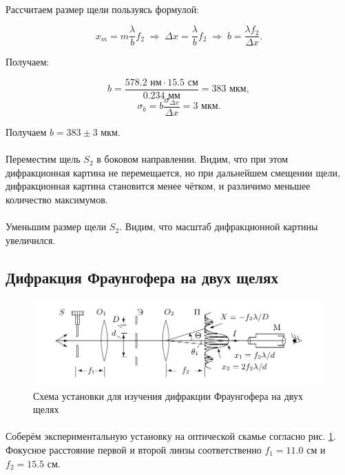 \documentclass[a4paper,12pt]{article} %
\begin{document}
\paragraph{} Рассчитаем размер щели пользуясь формулой:

\[
x_m = m \frac{\lambda}{b} f_2 \; \Rightarrow \; \Delta x = \frac{\lambda}{b} f_2 \; \Rightarrow \; b = \frac{\lambda f_2}{\Delta x}.
\]

\noindent Получаем:

\[
b = \frac{578.2 \text{ нм} \cdot 15.5 \text{ см}}{0.234 \text{ мм}} = 383 \text{ мкм},
\]\[
\sigma_b = b \frac{\sigma_{\Delta x}}{\Delta x} = 3 \text{ мкм}.
\]

\noindent Получаем $b = 383 \pm 3$ мкм.

\paragraph{} Переместим щель $S_2$ в боковом направлении. Видим, что при этом дифракционная картина не перемещается, но при дальнейшем смещении щели, дифракционная картина становится менее чётком, и различимо меньшее количество максимумов.

\paragraph{} Уменьшим размер щели $S_2$. Видим, что масштаб дифракционной картины увеличился.


\subsection{Дифракция Фраунгофера на двух щелях}

\begin{figure}[h]
\centering
\includegraphics[width=\textwidth]{setup3.png}
\caption{Схема установки для изучения дифракции Фраунгофера на двух щелях}
\label{fig:setup3}
\end{figure}

\paragraph{} Соберём экспериментальную установку на оптической скамье согласно рис. \ref{fig:setup3}. Фокусное расстояние первой и второй линзы соответственно $f_1 = 11.0$ см и $f_2 = 15.5$ см.
\end{document}
